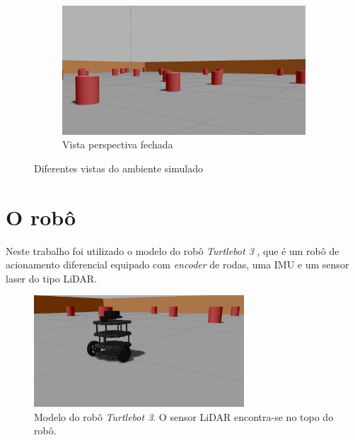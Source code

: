 \begin{figure}[h]
  \hfill
  \begin{subfigure}{\textwidth}
    \centering
    \includegraphics[width=.5\textwidth]{figs/environment-closer-perspective.jpg}
    \caption{Vista perspectiva fechada}
  \end{subfigure}
  \caption{Diferentes vistas do ambiente simulado}
  \label{fig:environment}
\end{figure}

\section{O robô}
Neste trabalho foi utilizado o modelo do robô \emph{Turtlebot 3} \cite{TurtleBot_3}, que é um robô de acionamento diferencial equipado com 
\textit{encoder} de rodas, uma IMU e um sensor laser do tipo LiDAR.
\begin{figure}[h]
  \centering
  \includegraphics[width=0.7\textwidth]{figs/robot-closeup.jpg}
  \caption{Modelo do robô \textit{Turtlebot 3}. O sensor LiDAR encontra-se no topo do robô.}
  \label{fig:turtlebot-digital-twin}
\end{figure}

